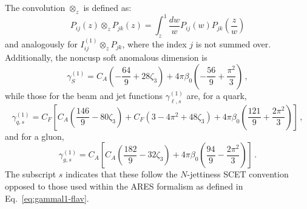 The convolution $\otimes_z$ is defined as:
\begin{equation}
P_{ij}(z)\otimes_z P_{jk}(z)=\int_z^1\frac{dw}{w}P_{ij}(w)P_{jk}\left(\frac{z}{w}\right)
\end{equation}
and analogously for $I_{ij}^{(1)}\otimes_z P_{jk}$, where the index $j$ is not summed over. 
Additionally,  the noncusp soft anomalous dimension is
\begin{equation}
\gamma_S^{(1)}=C_A\left(-\frac{64}{9}+28\zeta_3\right)+4\pi\beta_0\left(-\frac{56}{9}+\frac{\pi^2}{3}\right)\,,
\end{equation}
while those for the beam and jet functions $\gamma^{(1)}_{\ell,s}$ are, for a quark,
\begin{equation}
\gamma_{q,s}^{(1)}=C_F\left[C_A\left(\frac{146}{9}-80\zeta_3\right)+C_F(3-4\pi^2+48\zeta_3)+4\pi\beta_0\left(\frac{121}{9}+\frac{2\pi^2}{3}\right)\right]\,,
\end{equation}
and for a gluon,
\begin{equation}
\gamma_{g,s}^{(1)}=C_A\left[C_A\left(\frac{182}{9}-32\zeta_3\right)+4\pi\beta_0\left(\frac{94}{9}-\frac{2\pi^2}{3}\right)\right]\,.
\end{equation}
The subscript $s$ indicates that these follow the $N$-jettiness SCET convention opposed to 
those used within the \textsc{ARES} formalism as defined in Eq.~\eqref{eq:gammal1-flav}.


